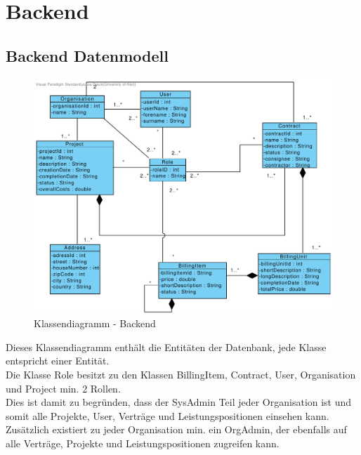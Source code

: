 
\section{Backend}

\subsection{Backend Datenmodell}

\begin{figure}[h]
	\centering
	\includegraphics[width=15cm]{img/diagrams/class-diagram-backend.pdf}
	\caption{Klassendiagramm - Backend}
	\label{fig:klassendiagramm-backend}
\end{figure}

\clearpage

\noindent
Dieses Klassendiagramm enthält die Entitäten der Datenbank, jede Klasse entspricht einer Entität. \\
Die Klasse Role besitzt zu den Klassen BillingItem, Contract, User, Organisation und Project min. 2 Rollen. \\
Dies ist damit zu begründen, dass der SysAdmin Teil jeder Organisation ist und somit alle Projekte, User, Verträge und Leistungspositionen einsehen kann.
Zusätzlich existiert zu jeder Organisation min. ein OrgAdmin, der ebenfalls auf alle Verträge, Projekte und Leistungspositionen zugreifen kann.
 
